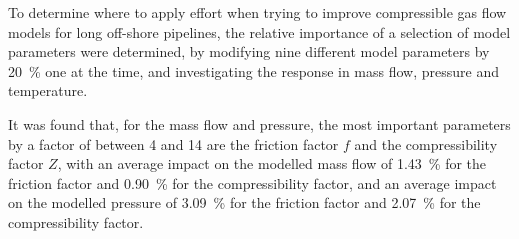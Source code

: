 
To determine where to apply effort when trying to improve compressible gas flow models for long off-shore pipelines, the relative importance of a selection of model parameters were determined, by modifying nine different model parameters by \SI{20}{\percent} one at the time, and investigating the response in mass flow, pressure and temperature.

It was found that, for the mass flow and pressure, the most important parameters by a factor of between 4 and 14 are the friction factor $f$ and the compressibility factor $Z$, with an average impact on the modelled mass flow of \SI{1.43}{\percent} for the friction factor and \SI{0.90}{\percent} for the compressibility factor, and an average impact on the modelled pressure of \SI{3.09}{\percent} for the friction factor and \SI{2.07}{\percent} for the compressibility factor.

